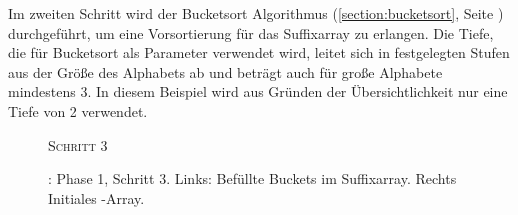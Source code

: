 Im zweiten Schritt wird der Bucketsort Algorithmus (\cref{section:bucketsort}, Seite \pageref{section:bucketsort}) durchgeführt, um eine Vorsortierung für das Suffixarray zu erlangen. Die Tiefe, die für Bucketsort als Parameter verwendet wird, leitet sich in festgelegten Stufen aus der Größe des Alphabets ab und beträgt auch für große Alphabete mindestens 3. In diesem Beispiel wird aus Gründen der Übersichtlichkeit nur eine Tiefe von 2 verwendet.\par
\begin{figure}[ht]
    {\centering\begin{minipage}{\textwidth}
        {\large \textsc{Schritt 3}}\par\medskip
        \hfill
    \end{minipage}}
    \caption[\bpr: Phase 1, Schritt 3]{\bpr: Phase 1, Schritt 3. Links: Befüllte Buckets im Suffixarray. Rechts Initiales \bptr-Array.}
    \label{bpr:p1s3}
\end{figure}
